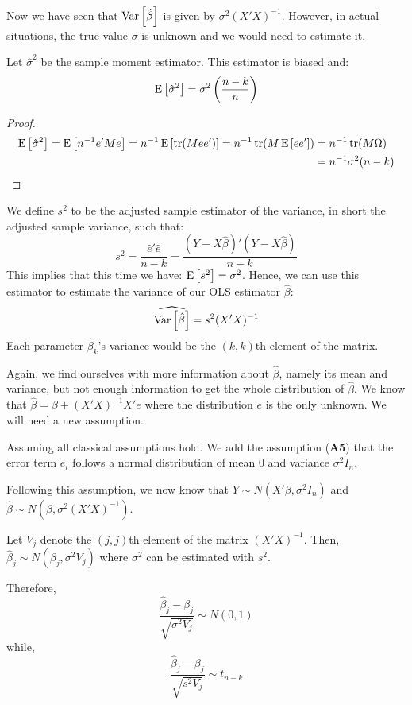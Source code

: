 Now we have seen that $\operatorname{Var}\left[\hat{\beta}\right]$ is given by $\sigma^2(X'X)^{-1}$. However, in actual situations, the true value $\sigma$ is unknown and we would need to estimate it.

\begin{proposition}
Let $\hat\sigma^2$ be the sample moment estimator. This estimator is biased and: $$\operatorname{E}\left[\hat{\sigma}^2\right] = \sigma^2\left(\frac{n-k}{n}\right)$$
\end{proposition}
\begin{proof}
\begin{align*}
\operatorname{E}\left[\hat\sigma^2\right] = \operatorname{E}\left[n^{-1}e'Me\right] = n^{-1}\operatorname{E}\left[\operatorname{tr}(Mee')\right] = n^{-1}\operatorname{tr}(M\operatorname{E}\left[ee'\right]) & = n^{-1}\operatorname{tr}(M\Omega) \\ & = n^{-1}\sigma^2(n-k)
\end{align*}
\end{proof}

\begin{definition}
We define $s^2$ to be the adjusted sample estimator of the variance, in short the adjusted sample variance, such that: $$s^2 = \frac{\hat e'\hat e}{n-k}=\frac{(Y - X\hat{\beta})'(Y - X\hat{\beta})}{n-k}$$ This implies that this time we have: $\operatorname{E}\left[s^2\right] = \sigma^2$. 
Hence, we can use this estimator to estimate the variance of our OLS estimator $\hat\beta$: $$\widehat{\operatorname{Var}\left[\hat{\beta}\right]} = s^2(X'X)^{-1}$$ Each parameter $\hat{\beta}_k$'s variance would be the $(k,k)$th element of the matrix.
\end{definition}

Again, we find ourselves with more information about $\hat{\beta}$, namely its mean and variance, but not enough information to get the whole distribution of $\hat{\beta}$. We know that $\hat{\beta} = \beta + (X'X)^{-1}X'e$ where the distribution $e$ is the only unknown. We will need a new assumption.
\begin{definition}
Assuming all classical assumptions hold. We add the assumption (\textbf{A5}) that the error term $e_i$ follows a normal distribution of mean $0$ and variance $\sigma^2I_n$.

Following this assumption, we now know that $Y\sim N(X'\beta, \sigma^2 I_n)$ and $\hat{\beta}\sim N(\beta,\sigma^2(X'X)^{-1})$.
\end{definition}

\begin{proposition}
Let $V_j$ denote the $(j,j)$th element of the matrix $(X'X)^{-1}$. Then, $\hat{\beta}_j\sim N(\beta_j, \sigma^2V_j)$ where $\sigma^2$ can be estimated with $s^2$.

Therefore, $$\frac{\hat{\beta}_j -\beta_j}{\sqrt{\sigma^2V_j}}\sim N(0,1)$$ while, $$\frac{\hat{\beta}_j -\beta_j}{\sqrt{s^2V_j}}\sim t_{n-k}$$
\end{proposition}

